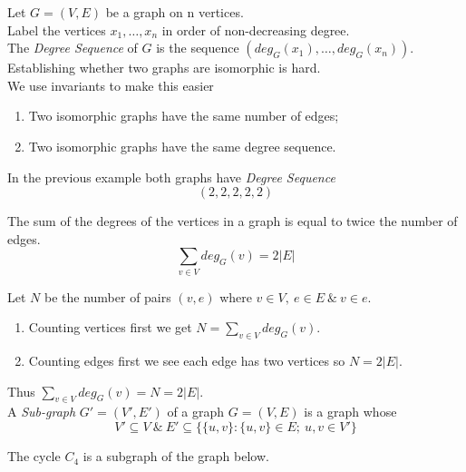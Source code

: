 \documentclass[11pt,a4paper]{article}
\begin{document}
Let $G=(V,E)$ be a graph on n vertices.\\
Label the vertices $x_1,\dots,x_n$ in order of non-decreasing degree.\\
The \textit{Degree Sequence} of $G$ is the sequence $(deg_G(x_1),\dots,deg_G(x_n))$.\\

Establishing whether two graphs are isomorphic is hard.\\
We use invariants to make this easier
\begin{enumerate}[label=\roman*)]
	\item Two isomorphic graphs have the same number of edges;
	\item Two isomorphic graphs have the same degree sequence.
\end{enumerate}

In the previous example both graphs have \textit{Degree Sequence}
$$(2,2,2,2,2)$$

The sum of the degrees of the vertices in a graph is equal to twice the number of edges.
$$\sum_{v\in V}deg_G(v)=2|E|$$

Let $N$ be the number of pairs $(v,e)$ where $v\in V,\ e\in E\ \&\ v\in e$.
\begin{enumerate}[label=\roman*)]
	\item Counting vertices first we get $N=\sum_{v\in V}deg_G(v)$.
	\item Counting edges first we see each edge has two vertices so $N=2|E|$.
\end{enumerate}
Thus $\sum_{v\in V}deg_G(v)=N=2|E|$.\\

A \textit{Sub-graph} $G'=(V',E')$ of a graph $G=(V,E)$ is a graph whose
$$V'\subseteq V\ \&\ E'\subseteq \{\{u,v\}:\{u,v\}\in E;\ u,v\in V'\}$$

The cycle $C_4$ is a subgraph of the graph below.\\
\end{document}
